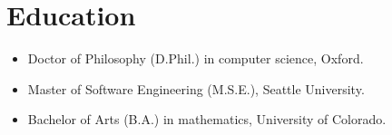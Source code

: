 \section*{Education}
\vspace{-2mm}

\begin{itemize}
    \item Doctor of Philosophy (D.Phil.) in computer science, Oxford.\vspace{-2mm}
	\item Master of Software Engineering (M.S.E.), Seattle University.\vspace{-2mm}
	\item Bachelor of Arts (B.A.) in mathematics, University of Colorado.
\end{itemize}

